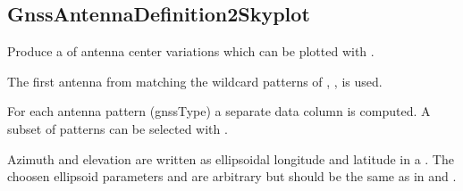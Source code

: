 \subsection{GnssAntennaDefinition2Skyplot}\label{GnssAntennaDefinition2Skyplot}
Produce a  of antenna center variations
which can be plotted with .

The first antenna from 
matching the wildcard patterns of , ,  is used.

For each antenna pattern (gnssType) a separate data column is computed.
A subset of patterns can be selected with .

Azimuth and elevation are written as ellipsoidal longitude and latitude in a .
The choosen ellipsoid parameters  and  are arbitrary but should be the same
as in  and .




